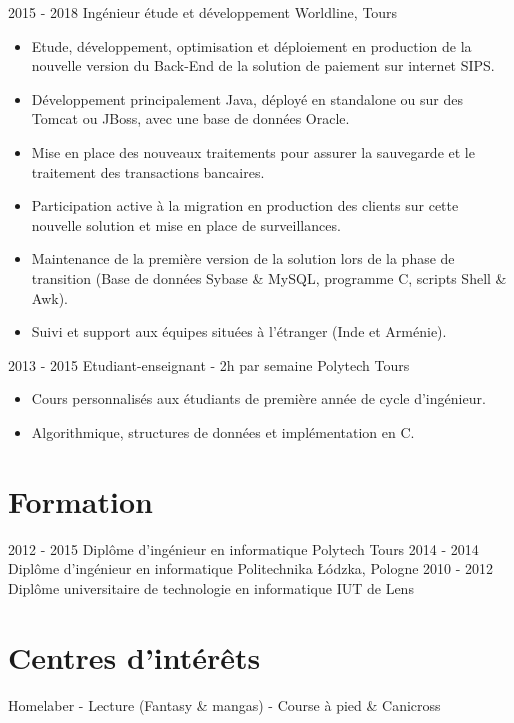\documentclass[]{friggeri-cv}
\begin{document}
\begin{entrylist}
    \entry
    {2015 - 2018}
    {Ingénieur étude et développement}
    {Worldline, Tours}
    {
    \vspace{-0.8\baselineskip}
    \begin{itemize}[leftmargin=*]
		\item Etude, développement, optimisation et déploiement en production de la nouvelle version du Back-End de la solution de paiement sur internet SIPS.
		\item Développement principalement Java, déployé en standalone ou sur des Tomcat ou JBoss,  avec une base de données Oracle.
		\item Mise  en place des nouveaux traitements pour assurer la sauvegarde et le traitement des transactions bancaires.
		\item Participation active à la migration en production des clients sur cette nouvelle solution et mise en place de surveillances.
		\item Maintenance de la première version de la solution lors de la phase de transition (Base de données Sybase \& MySQL, programme C, scripts Shell \& Awk).
		\item Suivi et support aux équipes situées à l'étranger (Inde et Arménie).
	\end{itemize}
}
      \vspace{7pt}      
    \entry
    {2013 - 2015}
    {Etudiant-enseignant - 2h par semaine}
    {Polytech Tours}
    {
    \vspace{-0.8\baselineskip}
	\begin{itemize}[leftmargin=*]
		\item Cours personnalisés aux étudiants de première année de cycle d'ingénieur. 
		\item Algorithmique, structures de données et implémentation en C.
	\end{itemize}
    }
\end{entrylist}

\section{Formation}
\begin{entrylist}
  \vspace{-6pt}    
  \entry
    {2012 - 2015}
    {Diplôme d'ingénieur en informatique}
    {Polytech Tours}
    {}
  \vspace{-6pt}    
  \entry
    {2014 - 2014}
    {Diplôme d'ingénieur en informatique}
    {Politechnika Łódzka, Pologne}
    {}
  \entry
    {2010 - 2012}
    {Diplôme universitaire de technologie en informatique}
    {IUT de Lens}
    {}
\end{entrylist}

\section{Centres d'intérêts}
\begin{entrylist}
  \entry
    {Homelaber - Lecture (Fantasy \& mangas) - Course à pied \& Canicross}
    {}    {}    {}
\end{entrylist}
\end{document}
